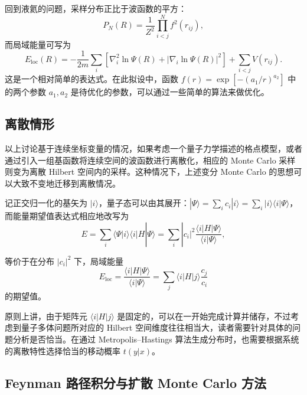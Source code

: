 回到液氦的问题，采样分布正比于波函数的平方：
\begin{equation}
P_N(R)=\frac1{Z^2}\prod_{i<j}^{N}f^2(r_{ij}),
\tag{7.6.16}
\end{equation}
而局域能量可写为
\begin{equation}
E_{\mathrm{loc}}(R)=-\frac1{2m}\sum_i\left[\nabla_i^2\ln\Psi(R)+|\nabla_i\ln\Psi(R)|^2\right]+\sum_{i<j}V(r_{ij}).
\tag{7.6.17}
\end{equation}
这是一个相对简单的表达式。在此拟设中，函数 $f(r)=\exp[-(a_1/r)^{a_2}]$ 中的两个参数 $a_1,a_2$ 是待优化的参数，可以通过一些简单的算法来做优化。

\subsection{离散情形}

以上讨论基于连续坐标变量的情况，如果考虑一个量子力学描述的格点模型，或者通过引入一组基函数将连续空间的波函数进行离散化，相应的 Monte Carlo 采样则变为离散 Hilbert 空间内的采样。这种情况下，上述变分 Monte Carlo 的思想可以大致不变地迁移到离散情况。

记正交归一化的基矢为 $|i\rangle$，量子态可以由其展开：$|\Psi\rangle=\sum_i c_i|i\rangle=\sum_i |i\rangle\langle i|\Psi\rangle$，而能量期望值表达式相应地改写为
\begin{equation}
E=\sum_i\langle\Psi|i\rangle\langle i|H|\Psi\rangle
=\sum_i|c_i|^2\frac{\langle i|H|\Psi\rangle}{\langle i|\Psi\rangle},
\tag{7.6.18}
\end{equation}

等价于在分布 $|c_i|^2$ 下，局域能量
\begin{equation}
E_{\mathrm{loc}}=\frac{\langle i|H|\Psi\rangle}{\langle i|\Psi\rangle}=\sum_j\langle i|H|j\rangle\frac{c_j}{c_i}
\tag{7.6.19}
\end{equation}
的期望值。

原则上讲，由于矩阵元 $\langle i|H|j\rangle$ 是固定的，可以在一开始完成计算并储存，不过考虑到量子多体问题所对应的 Hilbert 空间维度往往相当大，读者需要针对具体的问题分析是否恰当。在通过 Metropolis--Hastings 算法生成分布时，也需要根据系统的离散特性选择恰当的移动概率 $t(y|x)$。

\subsection{Feynman 路径积分与扩散 Monte Carlo 方法}

